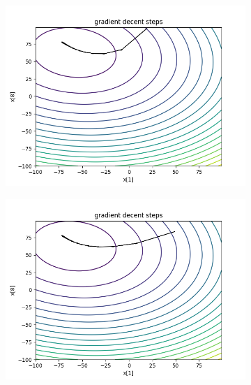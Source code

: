 	\begin{figure}[h!]
	\centering
	\begin{subfigure}[b]{0.45\linewidth}
		\includegraphics[width=\linewidth]{photos/f1_1_0.png}
		\end{subfigure}
		\begin{subfigure}[b]{0.45\linewidth}
			\includegraphics[width=\linewidth]{photos/f1_2_0.png}
		\end{subfigure}
		\begin{subfigure}[b]{0.45\linewidth}

\end{subfigure}
\end{figure}

